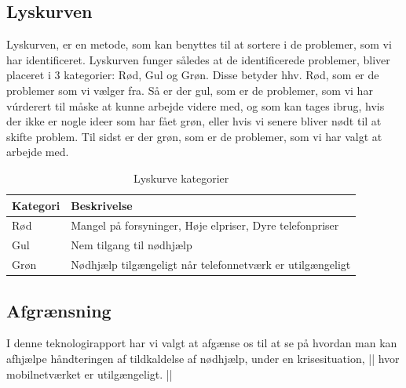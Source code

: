 \subsection{Lyskurven}
Lyskurven, er en metode, som kan benyttes til at sortere i de problemer, som vi har identificeret. Lyskurven funger således at de identificerede problemer, bliver placeret i 3 kategorier: Rød, Gul og Grøn. Disse betyder hhv. Rød, som er de problemer som vi vælger fra. Så er der gul, som er de problemer, som vi har vúrderert til måske at kunne arbejde videre med, og som kan tages ibrug, hvis der ikke er nogle ideer som har fået grøn, eller hvis vi senere bliver nødt til at skifte problem. Til sidst er der grøn, som er de problemer, som vi har valgt at arbejde med.

\begin{table}[H]
\centering
\begin{tabular}{|p{}|p{}|}
\hline
\textbf{Kategori} & \textbf{Beskrivelse} \\
\hline
Rød & Mangel på forsyninger, Høje elpriser, Dyre telefonpriser \\
\hline
Gul & Nem tilgang til nødhjælp \\
\hline
Grøn & Nødhjælp tilgængeligt når telefonnetværk er utilgængeligt \\
\hline
\end{tabular}
\caption{Lyskurve kategorier}
\label{tab:lyskurve}
\end{table}

\newpage
\subsection{Afgrænsning}
I denne teknologirapport har vi valgt at afgænse os til at se på hvordan man kan afhjælpe håndteringen af tildkaldelse af nødhjælp, under en krisesituation, || hvor mobilnetværket er utilgængeligt. ||
 